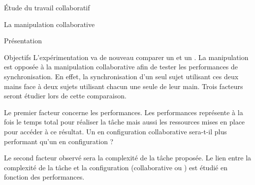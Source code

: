 \documentclass[myfrancais]{mythesis}
\begin{document}
\begin{mypart}{Étude du travail collaboratif}
\begin{mychapter}{La manipulation collaborative}
\begin{mysection}{Présentation}
\begin{mysubsection}{Objectifs}
					L'expérimentation va de nouveau comparer un  et un .
					La manipulation  est opposée à la manipulation collaborative afin de tester les performances de synchronisation.
					En effet, la synchronisation d'un seul sujet utilisant ces deux mains face à deux sujets utilisant chacun une seule de leur main.
					Trois facteurs seront étudier lors de cette comparaison.

					Le premier facteur concerne les performances.
					Les performances représente à la fois le temps total pour réaliser la tâche mais aussi les ressources mises en place pour accéder à ce résultat.
					Un  en configuration collaborative sera-t-il plus performant qu'un  en configuration  ?

					Le second facteur observé sera la complexité de la tâche proposée.
					Le lien entre la complexité de la tâche et la configuration (collaborative ou ) est étudié en fonction des performances.


\end{mysubsection}
\end{mysection}
\end{mychapter}
\end{mypart}
\end{document}
